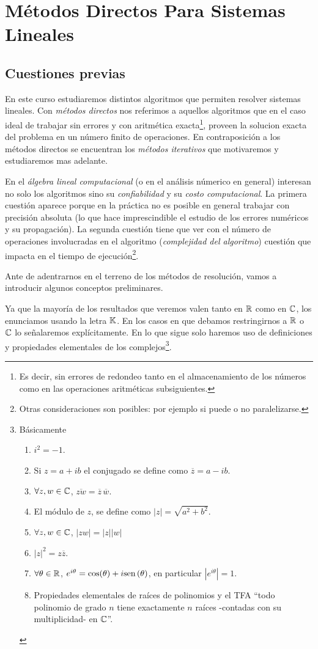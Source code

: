 \chapter{Métodos Directos Para Sistemas Lineales}
\setcounter{equation}{0}
\section{Cuestiones previas}

En este curso estudiaremos distintos algoritmos que permiten resolver sistemas lineales. Con \emph{métodos directos} nos referimos a aquellos algoritmos que en el caso ideal de trabajar sin errores y con aritmética exacta\footnote{Es decir, sin errores de redondeo tanto en el almacenamiento de los números como en las operaciones aritméticas subsiguientes.}, proveen la solucion exacta del problema
en un número finito de operaciones. En contraposición a los métodos directos se encuentran los \emph{métodos iterativos} que motivaremos y estudiaremos mas adelante.

En el \emph{álgebra lineal computacional} (o en el análisis númerico en general) interesan no solo los algoritmos sino su \emph{confiabilidad}  y su \emph{costo computacional}. La primera cuestión aparece porque en la práctica no es posible en general trabajar con precisión absoluta (lo que hace imprescindible el  estudio de los errores numéricos y su propagación). La segunda cuestión tiene que ver con el número de operaciones involucradas en el algoritmo (\emph{complejidad del algoritmo}) cuestión que impacta en el tiempo de ejecución\footnote{Otras consideraciones son posibles: por ejemplo si puede o no paralelizarse.}.

Ante de adentrarnos en el terreno de los métodos de resolución, vamos a introducir algunos conceptos preliminares.

Ya que la mayoría de los resultados que veremos valen tanto en $\mathbb R$ como en $\mathbb C$, los enunciamos usando la letra $\mathbb K$. En los casos en que debamos restringirnos a $\mathbb R$ o $\mathbb C$ lo señalaremos explícitamente. En lo que sigue solo haremos uso de  definiciones y propiedades elementales de los complejos\footnote{Básicamente
\begin{enumerate}
\item $i^2=-1$.
 \item Si $z=a+ib$ el conjugado se define como $\overline{z}=a-ib$.
 \item $\forall z,w\in \mathbb C$,  $\overline{zw}=\overline{z}\,\overline{w}$.
 \item El módulo de $z$, se define como $|z|=\sqrt{a^2+b^2}$.
 \item $\forall z,w\in \mathbb C$, $|zw|=|z||w|$
 \item $|z|^2=z\overline{z}$.
 \item $\forall \theta\in \mathbb R$, $e^{i\theta}=\cos(\theta)+i\mbox{sen\,}(\theta)$, en particular $|e^{i\theta}|=1$.
 \item Propiedades elementales  de raíces de polinomios y el TFA ``todo polinomio de grado $n$ tiene exactamente $n$ raíces -contadas con su multiplicidad- en $\mathbb C$''.
\end{enumerate}
}.

